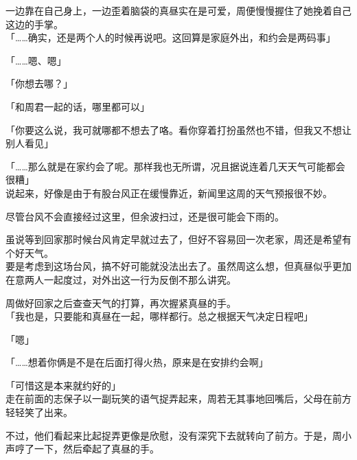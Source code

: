 一边靠在自己身上，一边歪着脑袋的真昼实在是可爱，周便慢慢握住了她挽着自己这边的手掌。\\

「……确实，还是两个人的时候再说吧。这回算是家庭外出，和约会是两码事」

「……嗯、嗯」

「你想去哪？」

「和周君一起的话，哪里都可以」

「你要这么说，我可就哪都不想去了咯。看你穿着打扮虽然也不错，但我又不想让别人看见」

「……那么就是在家约会了呢。那样我也无所谓，况且据说连着几天天气可能都会很糟」\\

说起来，好像是由于有股台风正在缓慢靠近，新闻里这周的天气预报很不妙。

尽管台风不会直接经过这里，但余波扫过，还是很可能会下雨的。

虽说等到回家那时候台风肯定早就过去了，但好不容易回一次老家，周还是希望有个好天气。\\

要是考虑到这场台风，搞不好可能就没法出去了。虽然周这么想，但真昼似乎更加在意两人一起度过，对外出这一行为反倒不那么讲究。

周做好回家之后查查天气的打算，再次握紧真昼的手。\\

「我也是，只要能和真昼在一起，哪样都行。总之根据天气决定日程吧」

「嗯」

「……想着你俩是不是在后面打得火热，原来是在安排约会啊」

「可惜这是本来就约好的」\\

走在前面的志保子以一副玩笑的语气捉弄起来，周若无其事地回嘴后，父母在前方轻轻笑了出来。

不过，他们看起来比起捉弄更像是欣慰，没有深究下去就转向了前方。于是，周小声哼了一下，然后牵起了真昼的手。
